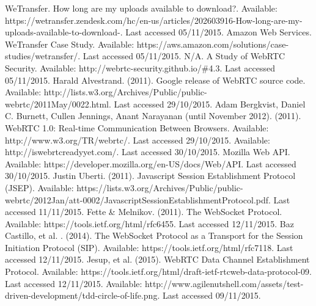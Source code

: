 \documentclass[]{report}
\begin{document}
\begin{thebibliography}{20}
		WeTransfer. How long are my uploads available to download?. Available: https://wetransfer.zendesk.com/hc/en-us/articles/202603916-How-long-are-my-uploads-available-to-download-. Last accessed 05/11/2015.
		Amazon Web Services. WeTransfer Case Study. Available: https://aws.amazon.com/solutions/case-studies/wetransfer/. Last accessed 05/11/2015.
		N/A. A Study of WebRTC Security. Available: http://webrtc-security.github.io/\#4.3. Last accessed 05/11/2015.
		Harald Alvestrand. (2011). Google release of WebRTC source code. Available: http://lists.w3.org/Archives/Public/public-webrtc/2011May/0022.html. Last accessed 29/10/2015.
		Adam Bergkvist, Daniel C. Burnett, Cullen Jennings, Anant Narayanan (until November 2012). (2011). WebRTC 1.0: Real-time Communication Between Browsers. Available: http://www.w3.org/TR/webrtc/. Last accessed 29/10/2015.
		Available: http://iswebrtcreadyyet.com/. Last accessed 30/10/2015.
		Mozilla Web API. Available: https://developer.mozilla.org/en-US/docs/Web/API. Last accessed 30/10/2015.
		Justin Uberti. (2011). Javascript Session Establishment Protocol (JSEP). Available: https://lists.w3.org/Archives/Public/public-webrtc/2012Jan/att-0002/JavascriptSessionEstablishmentProtocol.pdf. Last accessed 11/11/2015.
		Fette \& Melnikov. (2011). The WebSocket Protocol. Available: https://tools.ietf.org/html/rfc6455. Last accessed 12/11/2015.
		Baz Castillo, et al. . (2014). The WebSocket Protocol as a Transport for the Session Initiation Protocol (SIP). Available: https://tools.ietf.org/html/rfc7118. Last accessed 12/11/2015.
		Jesup, et al. (2015). WebRTC Data Channel Establishment Protocol. Available: https://tools.ietf.org/html/draft-ietf-rtcweb-data-protocol-09. Last accessed 12/11/2015.
		Available: http://www.agilenutshell.com/assets/test-driven-development/tdd-circle-of-life.png. Last accessed 09/11/2015.
	\end{thebibliography}
\end{document}
